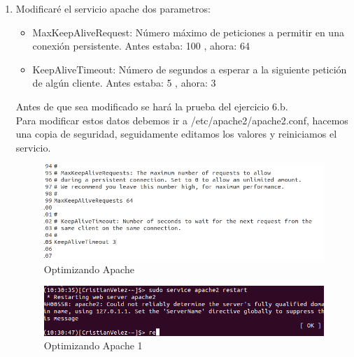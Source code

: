 \begin{enumerate}[label=(\alph*)]
	\item 
Modificaré el servicio apache dos parametros:

\begin{itemize}
	\item MaxKeepAliveRequest: Número máximo de peticiones a permitir en una conexión persistente. Antes estaba: 100 , ahora: 64
	
	\item KeepAliveTimeout: Número de segundos a esperar a la siguiente petición de algún cliente. Antes estaba: 5 , ahora: 3
\end{itemize}

Antes de que sea modificado se hará la prueba del ejercicio 6.b.\\

Para modificar estos datos debemos ir a /etc/apache2/apache2.conf, hacemos una copia de seguridad, seguidamente editamos los valores y reiniciamos el servicio.

\begin{figure}[H] %
	\centering
	\includegraphics[scale=0.5]{pics/12}  %
	\caption{Optimizando Apache} \label{fig:5}
\end{figure}

\begin{figure}[H] %
	\centering
	\includegraphics[scale=0.5]{pics/13}  %
	\caption{Optimizando Apache 1} \label{fig:6}
\end{figure}


\end{enumerate}
